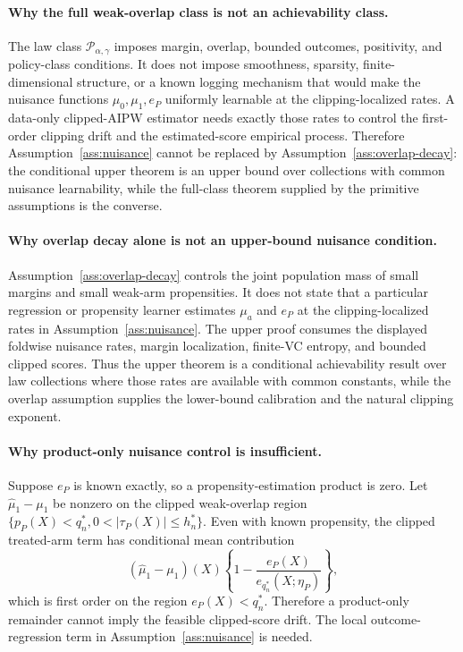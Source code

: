 \documentclass[11pt]{article}
\theoremstyle{definition}
\theoremstyle{plain}
\theoremstyle{remark}
\begin{document}
\paragraph{Why the full weak-overlap class is not an achievability class.}
The law class \(\mathcal P_{\alpha,\gamma}\) imposes margin, overlap, bounded
outcomes, positivity, and policy-class conditions.  It does not impose
smoothness, sparsity, finite-dimensional structure, or a known logging
mechanism that would make the nuisance functions \(\mu_0,\mu_1,e_P\)
uniformly learnable at the clipping-localized rates.  A data-only
clipped-AIPW estimator needs exactly those rates to control the first-order
clipping drift and the estimated-score empirical process.  Therefore
Assumption~\ref{ass:nuisance} cannot be replaced by
Assumption~\ref{ass:overlap-decay}: the conditional upper theorem is an
upper bound over collections with common nuisance learnability, while the
full-class theorem supplied by the primitive assumptions is the converse.

\paragraph{Why overlap decay alone is not an upper-bound nuisance condition.}
Assumption~\ref{ass:overlap-decay} controls the joint population mass of
small margins and small weak-arm propensities.  It does not state that a
particular regression or propensity learner estimates \(\mu_a\) and \(e_P\)
at the clipping-localized rates in Assumption~\ref{ass:nuisance}.  The upper
proof consumes the displayed foldwise nuisance rates, margin localization,
finite-VC entropy, and bounded clipped scores.  Thus the upper theorem is a
conditional achievability result over law collections where those rates are
available with common constants, while the overlap assumption supplies the
lower-bound calibration and the natural clipping exponent.

\paragraph{Why product-only nuisance control is insufficient.}
Suppose \(e_P\) is known exactly, so a propensity-estimation product is zero.
Let \(\widehat\mu_1-\mu_1\) be nonzero on the clipped weak-overlap region
\(\{p_P(X)<q_n^*,0<|\tau_P(X)|\le h_n^*\}\).  Even with known propensity, the
clipped treated-arm term has conditional mean contribution
\[
(\widehat\mu_1-\mu_1)(X)
\left\{1-\frac{e_P(X)}{e_{q_n^*}(X;\eta_P)}\right\},
\]
which is first order on the region \(e_P(X)<q_n^*\).  Therefore a
product-only remainder cannot imply the feasible clipped-score drift.  The
local outcome-regression term in Assumption~\ref{ass:nuisance} is needed.
\end{document}
